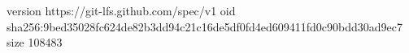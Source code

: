 version https://git-lfs.github.com/spec/v1
oid sha256:9bed35028fc624de82b3dd94c21c16de5df0fd4ed609411fd0c90bdd30ad9ec7
size 108483
